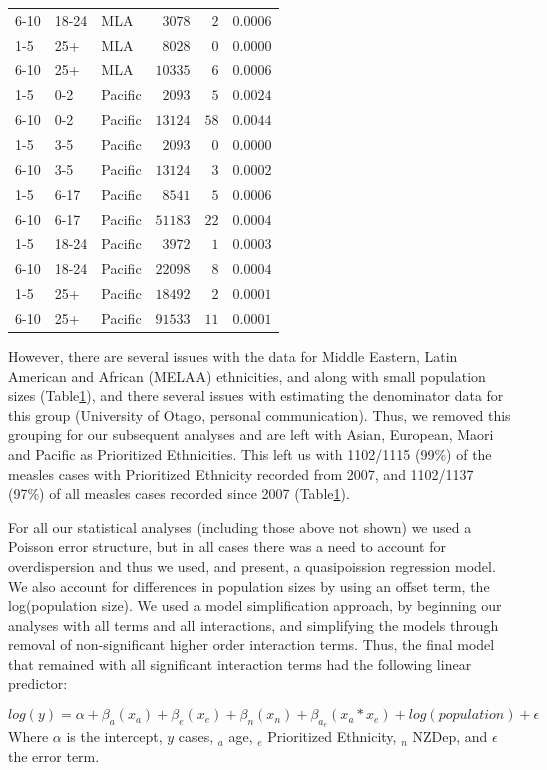 \documentclass{article}
\begin{document}
\begin{table}
\begin{center}
\begin{tabular}{lllrrr}
6-10&18-24&MLA&$   3078$&$  2$&$0.0006$\tabularnewline
1-5&25+&MLA&$   8028$&$  0$&$0.0000$\tabularnewline
6-10&25+&MLA&$  10335$&$  6$&$0.0006$\tabularnewline
1-5&0-2&Pacific&$   2093$&$  5$&$0.0024$\tabularnewline
6-10&0-2&Pacific&$  13124$&$ 58$&$0.0044$\tabularnewline
1-5&3-5&Pacific&$   2093$&$  0$&$0.0000$\tabularnewline
6-10&3-5&Pacific&$  13124$&$  3$&$0.0002$\tabularnewline
1-5&6-17&Pacific&$   8541$&$  5$&$0.0006$\tabularnewline
6-10&6-17&Pacific&$  51183$&$ 22$&$0.0004$\tabularnewline
1-5&18-24&Pacific&$   3972$&$  1$&$0.0003$\tabularnewline
6-10&18-24&Pacific&$  22098$&$  8$&$0.0004$\tabularnewline
1-5&25+&Pacific&$  18492$&$  2$&$0.0001$\tabularnewline
6-10&25+&Pacific&$  91533$&$ 11$&$0.0001$\tabularnewline
\hline
\end{tabular}\end{center}\label{table:percap}
\end{table}

However, there are several issues with the data for Middle Eastern, Latin American and African (MELAA) ethnicities, and along with small population sizes (Table\ref{table:percap}), and there several issues with estimating the denominator data for this group (University of Otago, personal communication). Thus, we removed this grouping for our subsequent analyses and are left with Asian, European, Maori and Pacific as Prioritized Ethnicities. This left us with 1102/1115 (99\%) of the measles cases with Prioritized Ethnicity recorded from 2007, and 1102/1137 (97\%) of all measles cases recorded since 2007 (Table\ref{table:percap}).

For all our statistical analyses (including those above not shown) we used a Poisson error structure, but in all cases there was a need to account for overdispersion and thus we used, and present, a quasipoission regression model. We also account for differences in population sizes by using an offset term, the log(population size). We used a model simplification approach, by beginning our analyses with all terms and all interactions, and simplifying the models through removal of non-significant higher order interaction terms. Thus, the final model that remained with all significant interaction terms had the following linear predictor:

\begin{equation} \label{eq:reg}
 log(y) = \alpha + \beta _a (x_a)+ \beta _e(x_e)+ \beta _n (x_n) + \beta _a_e(x_a * x_e)+ log(population)  + \epsilon
  \end{equation}
Where $\alpha$ is the intercept, $y$ cases, $_a$ age, $_e$ Prioritized Ethnicity, $_n$ NZDep, and $\epsilon$ the error term.
\end{document}

